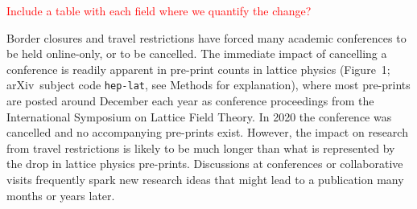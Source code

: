 \documentclass[a4paper,12pt]{article}
\newcommand{\todo}[1]{\textcolor{red}{#1}}
\newcommand{\arxiv}{arXiv}
\begin{document}
\noindent\todo{Include a table with each field where we quantify the change?}


Border closures and travel restrictions have forced many academic conferences to be held online-only, or to be cancelled. The immediate impact of cancelling a conference is readily apparent in pre-print counts in lattice physics (Figure~1; \arxiv\ subject code \texttt{hep-lat}, see Methods for explanation), where most pre-prints are posted around December each year as conference proceedings from the International Symposium on Lattice Field Theory. In 2020 the conference was cancelled\cite{LatticeConferenceWebsite} and no accompanying pre-prints exist. However, the impact on research from travel restrictions is likely to be much longer than what is represented by the drop in lattice physics pre-prints. Discussions at conferences or collaborative visits frequently spark new research ideas that might lead to a publication many months or years later. 
\end{document}
